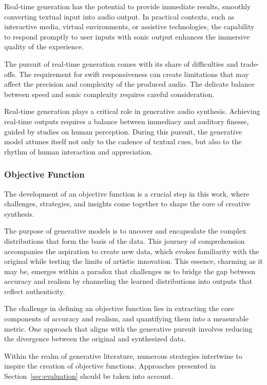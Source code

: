 Real-time generation has the potential to provide immediate results, smoothly converting textual input into audio output. In practical contexts, such as interactive media, virtual environments, or assistive technologies, the capability to respond promptly to user inputs with sonic output enhances the immersive quality of the experience.

The pursuit of real-time generation comes with its share of difficulties and trade-offs. The requirement for swift responsiveness can create limitations that may affect the precision and complexity of the produced audio. The delicate balance between speed and sonic complexity requires careful consideration.

Real-time generation plays a critical role in generative audio synthesis. Achieving real-time outputs requires a balance between immediacy and auditory finesse, guided by studies on human perception. During this pursuit, the generative model attunes itself not only to the cadence of textual cues, but also to the rhythm of human interaction and appreciation.

\subsubsection{Objective Function}

The development of an objective function is a crucial step in this work, where challenges, strategies, and insights come together to shape the core of creative synthesis.

The purpose of generative models is to uncover and encapsulate the complex distributions that form the basis of the data. This journey of comprehension accompanies the aspiration to create new data, which evokes familiarity with the original while testing the limits of artistic innovation. This essence, charming as it may be, emerges within a paradox that challenges us to bridge the gap between accuracy and realism by channeling the learned distributions into outputs that reflect authenticity.

The challenge in defining an objective function lies in extracting the core components of accuracy and realism, and quantifying them into a measurable metric. One approach that aligns with the generative pursuit involves reducing the divergence between the original and synthesized data.

Within the realm of generative literature, numerous strategies intertwine to inspire the creation of objective functions. Approaches presented in Section~\ref{sec:evaluation} should be taken into account.

